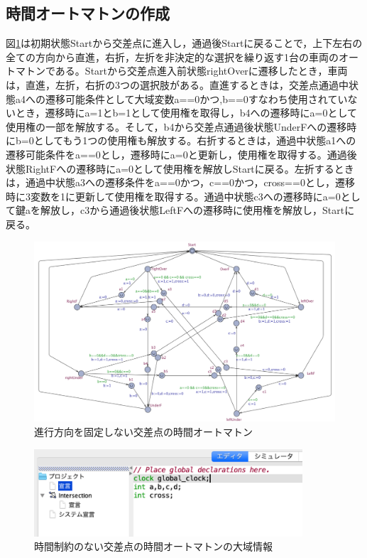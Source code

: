 \documentclass{tpu-sotu}
\begin{document}
	\subsection{時間オートマトンの作成}	
	図\ref{IB}は初期状態Startから交差点に進入し，通過後Startに戻ることで，上下左右の全ての方向から直進，右折，左折を非決定的な選択を繰り返す1台の車両のオートマトンである。Startから交差点進入前状態rightOverに遷移したとき，車両は，直進，左折，右折の3つの選択肢がある。直進するときは，交差点通過中状態a4への遷移可能条件として大域変数a==0かつ,b==0すなわち使用されていないとき，遷移時にa=1とb=1として使用権を取得し，b4への遷移時にa=0として使用権の一部を解放する。そして，b4から交差点通過後状態UnderFへの遷移時にb=0としてもう1つの使用権も解放する。右折するときは，通過中状態a1への遷移可能条件をa==0とし，遷移時にa=0と更新し，使用権を取得する。通過後状態RightFへの遷移時にa=0として使用権を解放しStartに戻る。左折するときは，通過中状態a3への遷移条件をa==0かつ，c==0かつ，cross==0とし，遷移時に3変数を1に更新して使用権を取得する。通過中状態c3への遷移時にa=0として鍵aを解放し，c3から通過後状態LeftFへの遷移時に使用権を解放し，Startに戻る。
	\begin{figure}[htbp]
	\centering
	\includegraphics[width=150mm]{IntersectionBig.png}
	\caption{進行方向を固定しない交差点の時間オートマトン}
	\label{IB}
	\end{figure}
	\begin{figure}[htbp]
	\centering
	\includegraphics[width=100mm]{IBSimuGD.png}
	\caption{時間制約のない交差点の時間オートマトンの大域情報}
	\label{IBSi}
	\end{figure}
\end{document}
